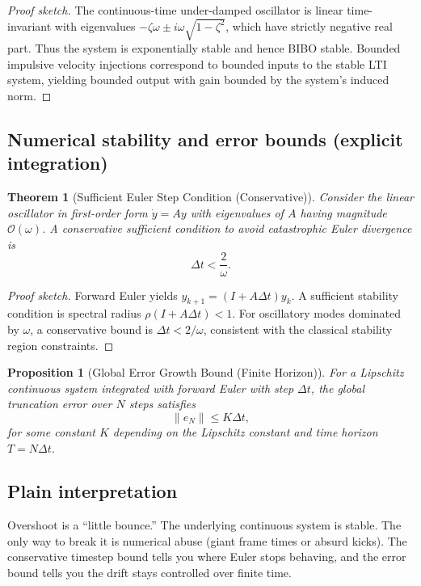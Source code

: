 \documentclass[journal]{IEEEtran}
\newtheorem{theorem}{Theorem}
\newtheorem{proposition}{Proposition}
\begin{document}
\begin{proof}[Proof sketch]
The continuous-time under-damped oscillator is linear time-invariant with eigenvalues \(-\zeta\omega \pm i\omega\sqrt{1-\zeta^2}\), which have strictly negative real part. Thus the system is exponentially stable and hence BIBO stable. Bounded impulsive velocity injections correspond to bounded inputs to the stable LTI system, yielding bounded output with gain bounded by the system's induced norm.
\end{proof}

\subsection{Numerical stability and error bounds (explicit integration)}

\begin{theorem}[Sufficient Euler Step Condition (Conservative)]
Consider the linear oscillator in first-order form \(\dot{y}=Ay\) with eigenvalues of \(A\) having magnitude \(\mathcal{O}(\omega)\). A conservative sufficient condition to avoid catastrophic Euler divergence is
\begin{equation}
\Delta t < \frac{2}{\omega}.
\end{equation}
\end{theorem}

\begin{proof}[Proof sketch]
Forward Euler yields \(y_{k+1}=(I+A\Delta t)y_k\). A sufficient stability condition is spectral radius \(\rho(I+A\Delta t)<1\). For oscillatory modes dominated by \(\omega\), a conservative bound is \(\Delta t<2/\omega\), consistent with the classical stability region constraints.
\end{proof}

\begin{proposition}[Global Error Growth Bound (Finite Horizon)]
For a Lipschitz continuous system integrated with forward Euler with step \(\Delta t\), the global truncation error over \(N\) steps satisfies
\[
\|e_N\| \le K \Delta t,
\]
for some constant \(K\) depending on the Lipschitz constant and time horizon \(T=N\Delta t\).
\end{proposition}

\subsection{Plain interpretation}
Overshoot is a ``little bounce.'' The underlying continuous system is stable. The only way to break it is numerical abuse (giant frame times or absurd kicks). The conservative timestep bound tells you where Euler stops behaving, and the error bound tells you the drift stays controlled over finite time.
\end{document}

